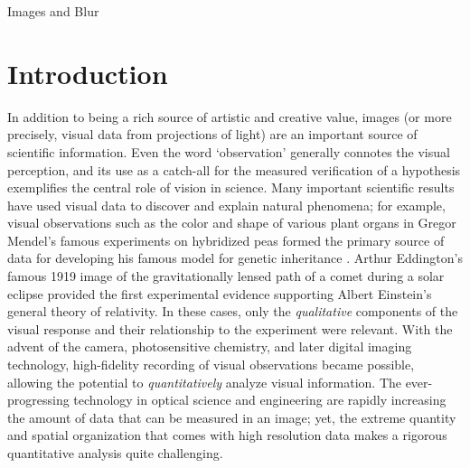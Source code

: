 \setlength{\parindent}{2ex}
\begin{chapter}{Images and Blur}\label{chapter:introduction}
  \section{Introduction}
  In addition to being a rich source of artistic and creative value, images (or more precisely, visual data from projections of light) are an important source of scientific information.
  Even the word `observation' generally connotes the visual perception, and its use as a catch-all for the measured verification of a hypothesis exemplifies the central role of vision in science.
  Many important scientific results have used visual data to discover and explain natural phenomena; for example, visual observations such as the color and shape of various plant organs in Gregor Mendel's famous experiments on hybridized peas formed the primary source of data for developing his famous model for genetic inheritance \citep{magner2002}.
  Arthur Eddington's famous 1919 image of the gravitationally lensed path of a comet during a solar eclipse \citep{eddington1920} provided the first experimental evidence supporting Albert Einstein's general theory of relativity.
  In these cases, only the \emph{qualitative} components of the visual response and their relationship to the experiment were relevant.
  With the advent of the camera, photosensitive chemistry, and later digital imaging technology, high-fidelity recording of visual observations became possible, allowing the potential to \emph{quantitatively} analyze visual information.
  The ever-progressing technology in optical science and engineering are rapidly increasing the amount of data that can be measured in an image; yet, the extreme quantity and spatial organization that comes with high resolution data makes a rigorous quantitative analysis quite challenging.


\end{chapter}
